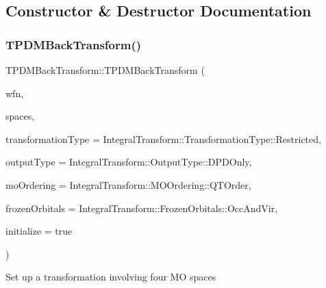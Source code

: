 \subsection{Constructor \& Destructor Documentation}
\mbox{\label{classpsi_1_1_t_p_d_m_back_transform_a1137d921d3764f2bb73644e3b069eb6c}} 
\subsubsection{\texorpdfstring{T\+P\+D\+M\+Back\+Transform()}{TPDMBackTransform()}}
{\footnotesize\ttfamily T\+P\+D\+M\+Back\+Transform\+::\+T\+P\+D\+M\+Back\+Transform (\begin{DoxyParamCaption}\item[{Shared\+Wavefunction}]{wfn,  }\item[{\mbox{\hyperlink{namespacepsi_ad84f5058fdd5b69df3b06b9959251147}{Space\+Vec}}}]{spaces,  }\item[{Transformation\+Type}]{transformation\+Type = {\ttfamily IntegralTransform\+:\+:TransformationType\+:\+:Restricted},  }\item[{Output\+Type}]{output\+Type = {\ttfamily IntegralTransform\+:\+:OutputType\+:\+:DPDOnly},  }\item[{M\+O\+Ordering}]{mo\+Ordering = {\ttfamily IntegralTransform\+:\+:MOOrdering\+:\+:QTOrder},  }\item[{Frozen\+Orbitals}]{frozen\+Orbitals = {\ttfamily IntegralTransform\+:\+:FrozenOrbitals\+:\+:OccAndVir},  }\item[{bool}]{initialize = {\ttfamily true} }\end{DoxyParamCaption})}

Set up a transformation involving four MO spaces


